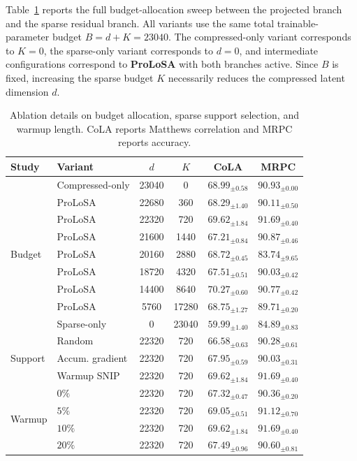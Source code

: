 Table~\ref{tab:ablation_budget_full} reports the full budget-allocation sweep between the projected branch and the sparse residual branch.
All variants use the same total trainable-parameter budget $B=d+K=23040$.
The compressed-only variant corresponds to $K=0$, the sparse-only variant corresponds to $d=0$, and intermediate configurations correspond to \textbf{ProLoSA} with both branches active.
Since $B$ is fixed, increasing the sparse budget $K$ necessarily reduces the compressed latent dimension $d$.

\begin{table}[t]
\centering
\small
\renewcommand{\arraystretch}{0.9} %
\setlength{\tabcolsep}{2.5pt}     %
\begin{tabular}{@{}llcccc@{}}      %
\toprule
Study & Variant & $d$ & $K$ & CoLA & MRPC \\
\midrule
\multirow{9}{*}{Budget}
& Compressed-only & 23040 & 0     & $68.99_{\pm 0.58}$ & $90.93_{\pm 0.00}$ \\
& ProLoSA & 22680 & 360   & $68.29_{\pm 1.40}$ & $90.11_{\pm 0.50}$ \\
& ProLoSA & 22320 & 720   & $69.62_{\pm 1.84}$ & $\mathbf{91.69}_{\pm 0.40}$ \\
& ProLoSA & 21600 & 1440  & $67.21_{\pm 0.84}$ & $90.87_{\pm 0.46}$ \\
& ProLoSA & 20160 & 2880  & $68.72_{\pm 0.45}$ & $83.74_{\pm 9.65}$ \\
& ProLoSA & 18720 & 4320  & $67.51_{\pm 0.51}$ & $90.03_{\pm 0.42}$ \\
& ProLoSA & 14400 & 8640  & $\mathbf{70.27}_{\pm 0.60}$ & $90.77_{\pm 0.42}$ \\
& ProLoSA & 5760  & 17280 & $68.75_{\pm 1.27}$ & $89.71_{\pm 0.20}$ \\
& Sparse-only & 0 & 23040 & $59.99_{\pm 1.40}$ & $84.89_{\pm 0.83}$ \\
\midrule
\multirow{3}{*}{Support}
& Random & 22320 & 720 & $66.58_{\pm 0.63}$ & $90.28_{\pm 0.61}$ \\
& Accum. gradient & 22320 & 720 & $67.95_{\pm 0.59}$ & $90.03_{\pm 0.31}$ \\
& Warmup SNIP & 22320 & 720 & $\mathbf{69.62}_{\pm 1.84}$ & $\mathbf{91.69}_{\pm 0.40}$ \\
\midrule
\multirow{4}{*}{Warmup}
& $0\%$ & 22320 & 720 & $67.32_{\pm 0.47}$ & $90.36_{\pm 0.20}$ \\
& $5\%$ & 22320 & 720 & $69.05_{\pm 0.51}$ & $91.12_{\pm 0.70}$ \\
& $10\%$ & 22320 & 720 & $\mathbf{69.62}_{\pm 1.84}$ & $\mathbf{91.69}_{\pm 0.40}$ \\
& $20\%$ & 22320 & 720 & $67.49_{\pm 0.96}$ & $90.60_{\pm 0.81}$ \\
\bottomrule
\end{tabular}
\caption{
Ablation details on budget allocation, sparse support selection, and warmup length.
CoLA reports Matthews correlation and MRPC reports accuracy.
}
\label{tab:ablation_budget_full}
\end{table}

\clearpage

